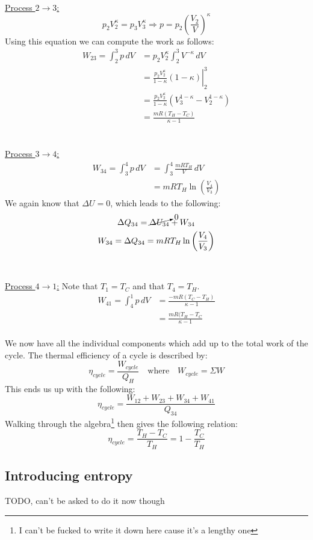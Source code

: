 \documentclass[11pt, a4paper]{article}
\begin{document}
\\
\underline{Process $2 \to 3$:}
\begin{equation}
  p_2V_2^\kappa = p_3V_3^\kappa \Rightarrow p = p_2 \left( \frac{V_2}{V} \right)^\kappa
\end{equation}
Using this equation we can compute the work as follows:
\begin{align}
  W_{23} = \int_2^3 p\,dV &= p_2V_2^\kappa \int_2^3 V^{-\kappa}\,dV\\
                          &= \left.\frac{p_2V_2^\kappa}{1 - \kappa}(1-\kappa)\right|_2^3\\
                          &= \frac{p_2V_2^\kappa}{1-\kappa}(V_3^{1-\kappa} - V_2^{1-\kappa})\\
                          &= \frac{mR(T_H - T_C)}{\kappa - 1}
\end{align}\\
\\
\underline{Process $3 \to 4$:}
\begin{align}
  W_{34} = \int_3^4 p\,dV &= \int_3^4 \frac{mRT_H}{V}\,dV\\
                          &= mRT_H \ln \left( \frac{V_4}{V_3} \right)
\end{align}
We again know that $\Delta U = 0$, which leads to the following:
\begin{gather}
  \Delta Q_{34} = \cancelto{0}{\Delta U_{34}} + W_{34}\\
  W_{34} = \Delta Q_{34} = mRT_H \ln \left( \frac{V_4}{V_3} \right)
\end{gather}\\
\\
\underline{Process $4 \to 1$:}
Note that $T_1 = T_C$ and that $T_4 = T_H$.
\begin{align}
  W_{41} = \int_4^1 p\,dV &= \frac{-mR(T_C - T_H)}{\kappa - 1}\\
                          &= \frac{mR(T_H - T_C}{\kappa - 1}
\end{align}\\
We now have all the individual components which add up to the total work of the cycle. The thermal efficiency of a cycle is described by:
\begin{equation}
  \eta_{cycle} = \frac{W_{cycle}}{Q_H} \quad \text{where} \quad W_{cycle} = \Sigma W
\end{equation}
This ends us up with the following:
\begin{equation}
  \eta_{cycle} = \frac{W_{12} + W_{23} + W_{34} + W_{41}}{Q_{34}}
\end{equation}
Walking through the algebra\footnote{I can't be fucked to write it down here cause it's a lengthy one} then gives the following relation:
\begin{equation}
  \eta_{cycle} = \frac{T_H - T_C}{T_H} = 1 - \frac{T_C}{T_H}
\end{equation}

\subsection{Introducing entropy}
TODO, can't be asked to do it now though
\end{document}
